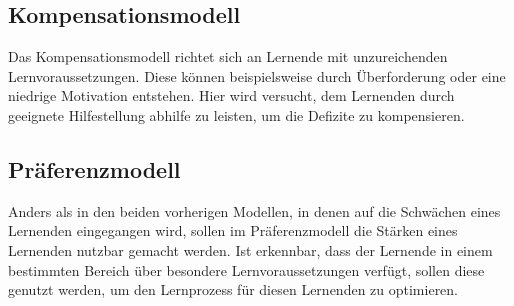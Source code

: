 \subsection{Kompensationsmodell}
Das Kompensationsmodell richtet sich an Lernende mit unzureichenden Lernvoraussetzungen.
Diese können beispielsweise durch Überforderung oder eine niedrige Motivation entstehen.
Hier wird versucht, dem Lernenden durch geeignete Hilfestellung abhilfe zu leisten, um die Defizite zu kompensieren.
\cite[S. 19]{lehmann2010lernstile}

\subsection{Präferenzmodell}
Anders als in den beiden vorherigen Modellen, in denen auf die Schwächen eines Lernenden eingegangen wird,
sollen im Präferenzmodell die Stärken eines Lernenden nutzbar gemacht werden. Ist erkennbar, dass
der Lernende in einem bestimmten Bereich über besondere Lernvoraussetzungen verfügt, sollen diese genutzt werden,
um den Lernprozess für diesen Lernenden zu optimieren.
\cite[S. 19]{lehmann2010lernstile}
